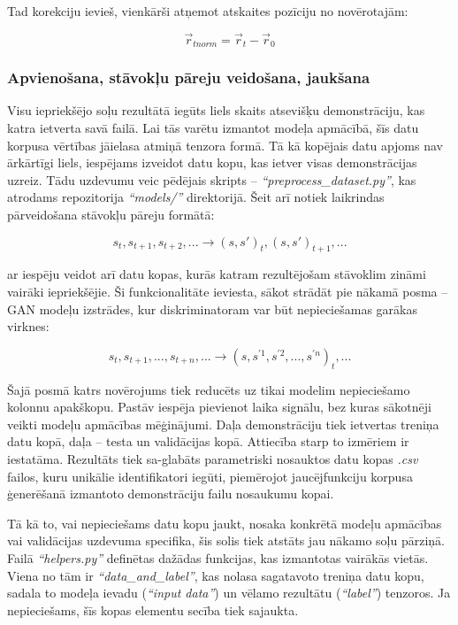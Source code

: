 \documentclass[12pt, a4paper]{article}
\numberwithin{equation}{section} %
\begin{document}
Tad korekciju ievieš, vienkārši atņemot atskaites pozīciju no novērotajām:

\begin{equation}
    \vec{r}_{tnorm} = \vec{r}_t - \vec{r}_0
\end{equation}

\subsubsection{Apvienošana, stāvokļu pāreju veidošana, jaukšana}

Visu iepriekšējo soļu rezultātā iegūts liels skaits atsevišķu demonstrāciju, kas katra ietverta savā failā. Lai tās varētu izmantot modeļa apmācībā, šīs datu korpusa vērtības jāielasa atmiņā tenzora formā. Tā kā kopējais datu apjoms nav ārkārtīgi liels, iespējams izveidot datu kopu, kas ietver visas demonstrācijas uzreiz. Tādu uzdevumu veic pēdējais skripts -- \textit{``preprocess\_dataset.py''}, kas atrodams repozitorija \textit{``models/''} direktorijā. Šeit arī notiek laikrindas pārveidošana stāvokļu pāreju formātā:

\begin{equation}
    s_t, s_{t+1}, s_{t+2}, ... \rightarrow (s,s')_t, (s,s')_{t+1}, ...
\end{equation}

ar iespēju veidot arī datu kopas, kurās katram rezultējošam stāvoklim zināmi vairāki iepriekšējie. Ši funkcionalitāte ieviesta, sākot strādāt pie nākamā posma -- GAN modeļu izstrādes, kur diskriminatoram var būt nepieciešamas garākas virknes:

\begin{equation}
    s_t, s_{t+1}, ..., s_{t+n}, ... \rightarrow (s,s^{'1}, s^{'2}, ..., s^{'n})_t, ...
\end{equation}

Šajā posmā katrs novērojums tiek reducēts uz tikai modelim nepieciešamo kolonnu apakškopu. Pastāv iespēja pievienot laika signālu, bez kuras sākotnēji veikti modeļu apmācības mēģinājumi. Daļa demonstrāciju tiek ietvertas treniņa datu kopā, daļa -- testa un validācijas kopā. Attiecība starp to izmēriem ir iestatāma. Rezultāts tiek sa-glabāts parametriski nosauktos datu kopas \textit{.csv} failos, kuru unikālie identifikatori iegūti, piemērojot jaucējfunkciju korpusa ģenerēšanā izmantoto demonstrāciju failu nosaukumu kopai.

Tā kā to, vai nepieciešams datu kopu jaukt, nosaka konkrētā modeļu apmācības vai validācijas uzdevuma specifika, šis solis tiek atstāts jau nākamo soļu pārziņā. Failā \textit{``helpers.py''} definētas dažādas funkcijas, kas izmantotas vairākās vietās. Viena no tām ir \textit{``data\_and\_label''}, kas nolasa sagatavoto treniņa datu kopu, sadala to modeļa ievadu (\textit{``input data''}) un vēlamo rezultātu (\textit{``label''}) tenzoros. Ja nepieciešams, šīs kopas elementu secība tiek sajaukta.
\end{document}
